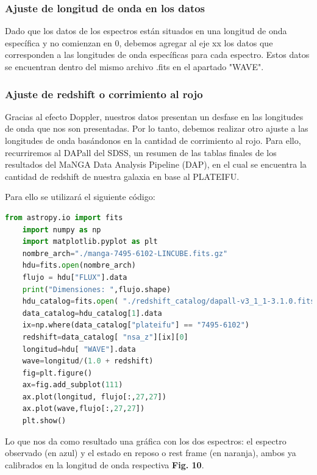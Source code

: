 \documentclass[10pt,twocolumn,a4paper]{opticajnl}
\begin{document}
\subsubsection*{Ajuste de longitud de onda en los datos}

Dado que los datos de los espectros están situados en una longitud de onda específica y no comienzan en 0, debemos agregar al eje xx los datos que corresponden a las longitudes de onda específicas para cada espectro. Estos datos se encuentran dentro del mismo archivo .fits en el apartado "WAVE".

\subsubsection*{Ajuste de redshift o corrimiento al rojo}

Gracias al efecto Doppler, nuestros datos presentan un desfase en las longitudes de onda que nos son presentadas. Por lo tanto, debemos realizar otro ajuste a las longitudes de onda basándonos en la cantidad de corrimiento al rojo. Para ello, recurriremos al DAPall del SDSS, un resumen de las tablas finales de los resultados del MaNGA Data Analysis Pipeline (DAP), en el cual se encuentra la cantidad de redshift de nuestra galaxia en base al PLATEIFU.

Para ello se utilizará el siguiente código:

\begin{lstlisting}[language=Python]
    from astropy.io import fits
    import numpy as np 
    import matplotlib.pyplot as plt
    nombre_arch="./manga-7495-6102-LINCUBE.fits.gz"
    hdu=fits.open(nombre_arch)
    flujo = hdu["FLUX"].data
    print("Dimensiones: ",flujo.shape)
    hdu_catalog=fits.open( "./redshift_catalog/dapall-v3_1_1-3.1.0.fits")
    data_catalog=hdu_catalog[1].data
    ix=np.where(data_catalog["plateifu"] == "7495-6102") 
    redshift=data_catalog[ "nsa_z"][ix][0]
    longitud=hdu[ "WAVE"].data
    wave=longitud/(1.0 + redshift)
    fig=plt.figure()
    ax=fig.add_subplot(111)
    ax.plot(longitud, flujo[:,27,27]) 
    ax.plot(wave,flujo[:,27,27])
    plt.show()
\end{lstlisting}

Lo que nos da como resultado una gráfica con los dos espectros: el espectro observado (en azul) y el estado en reposo o rest frame (en naranja), ambos ya calibrados en la longitud de onda respectiva \textbf{Fig. 10}.
\end{document}
